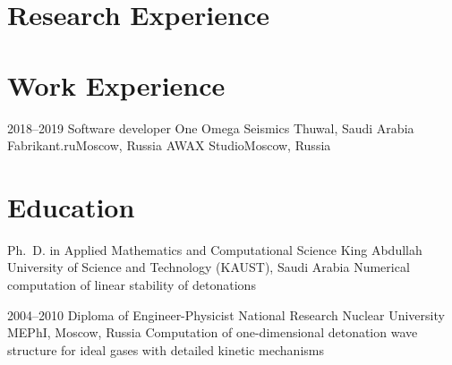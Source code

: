 \documentclass[11pt,a4paper,sans]{moderncv}
\begin{document}
\makecvtitle%


\section{Research Experience}



\section{Work Experience}

\cventry
{2018--2019}
{Software developer}
{One Omega Seismics}
{Thuwal, Saudi Arabia}
{}
{}
{Fabrikant.ru}{Moscow, Russia}{}{}
{AWAX Studio}{Moscow, Russia}{}{}


\section{Education}

        {Ph.\ D. in Applied Mathematics and Computational Science}
        {King Abdullah University of Science and Technology (KAUST), Saudi
          Arabia}
        {}{}{}
       {Numerical computation of linear stability of detonations}

\cventry
  {2004--2010}
  {Diploma of Engineer-Physicist}
  {National Research Nuclear University MEPhI, Moscow, Russia}{}{}{}
       {Computation of one-dimensional detonation wave structure for ideal
        gases with detailed kinetic mechanisms}
\end{document}
